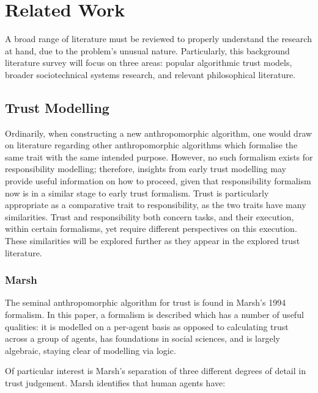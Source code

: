 \section{Related Work}\label{sec:related_work}
A broad range of literature must be reviewed to properly understand the research at hand, due to the problem's unusual nature. Particularly, this background literature survey will focus on three areas: popular algorithmic trust models, broader sociotechnical systems research, and relevant philosophical literature.\par

\subsection{Trust Modelling}
Ordinarily, when constructing a new anthropomorphic algorithm, one would draw on literature regarding other anthropomorphic algorithms which formalise the same trait with the same intended purpose. However, no such formalism exists for responsibility modelling; therefore, insights from early trust modelling may provide useful information on how to proceed, given that responsibility formalism now is in a similar stage to early trust formalism. Trust is particularly appropriate as a comparative trait to responsibility, as the two traits have many similarities. Trust and responsibility both concern tasks, and their execution, within certain formalisms, yet require different perspectives on this execution. These similarities will be explored further as they appear in the explored trust literature.\par

\subsubsection{Marsh\cite{Marsh1994FormalisingConcept}}
The seminal anthropomorphic algorithm for trust is found in Marsh's 1994 formalism\cite{Marsh1994FormalisingConcept}. In this paper, a formalism is described which has a number of useful qualities: it is modelled on a per-agent basis as opposed to calculating trust across a group of agents, has foundations in social sciences, and is largely algebraic, staying clear of modelling via logic.

Of particular interest is Marsh's separation of three different degrees of detail in trust judgement. Marsh identifies that human agents have:

